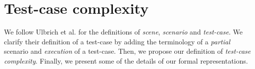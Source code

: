 \section{Test-case complexity}
\label{sec:definitions}

We follow Ulbrich et al. \cite{Ulbrich.2015} for the definitions of \emph{scene}, \emph{scenario} and \emph{test-case}.
%
We clarify their definition of a test-case by adding the terminology of a \emph{partial} scenario and \emph{execution} of a test-case.
%
Then, we propose our definition of \emph{test-case complexity}.
%
Finally, we present some of the details of our formal representations.




